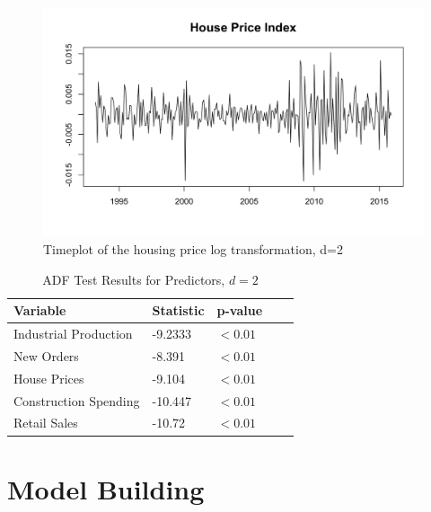 \documentclass[twoside,twocolumn]{article}
\begin{document}
		
		\begin{figure}[htb]
		\centering
		\caption{Timeplot of the housing price log transformation, d=2}
		\label{fig:loghouse}
		\includegraphics[width=\linewidth]{images/houseprice}
	\end{figure}


		 
\begin{table}[H]
		 \centering
		 \caption{ADF Test Results for Predictors, \(d=2\)}
		 \label{tab:ADF2}
		 \begin{tabular}{lllll}
		 \hline
		 \textbf{Variable} & \textbf{Statistic}  & \textbf{p-value}\\ \hline
		  Industrial Production & -9.2333  &\( < 0.01\)\\
		  New Orders &  -8.391  & \( < 0.01\)\\			  
		  House Prices &  -9.104  & \( < 0.01\)\\				  
		  Construction Spending &  -10.447 &  \( < 0.01\)\\
		  Retail Sales &  -10.72 &  \( < 0.01\)\\ \hline
		 \end{tabular}
		 \end{table}

	 

  



\section{Model Building}
\end{document}
